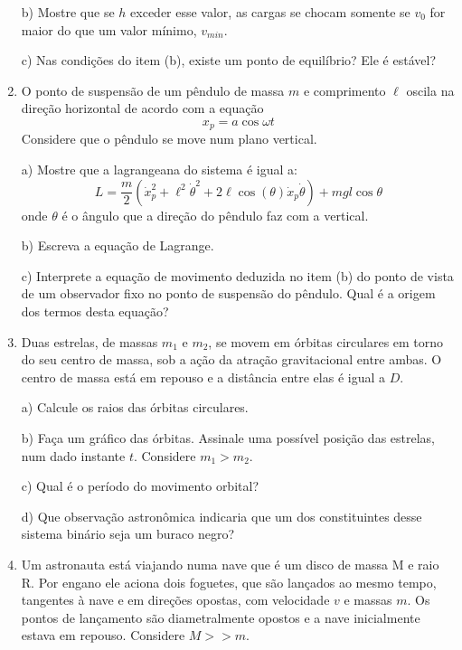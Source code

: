 \begin{enumerate}[start=1,label={\bfseries Q\arabic*.}]
\resposta

b) Mostre que se $h$ exceder esse valor, as cargas se chocam somente se $v_{0}$ for maior do que um valor mínimo, $v_{min}$.

\resposta

c) Nas condições do item (b), existe um ponto de equilíbrio? Ele é estável?

\resposta


\item O ponto de suspensão de um pêndulo de massa $m$ e comprimento $\ell$ oscila na direção horizontal de acordo com a equação
$$
x_{p} = a \operatorname{cos} \omega t
$$
Considere que o pêndulo se move num plano vertical.

a) Mostre que a lagrangeana do sistema é igual a:
$$
L = \frac{m}{2} (\dot{x}_{p}^{2} + \ell^{2} \dot{\theta}^{2} + 2 \ell \operatorname{cos}(\theta) \dot{x}_{p} \dot{\theta} ) + mgl \operatorname{cos} \theta
$$
onde $\theta$ é o ângulo que a direção do pêndulo faz com a vertical.

\resposta

b) Escreva a equação de Lagrange.

\resposta

c) Interprete a equação de movimento deduzida no item (b) do ponto de vista de um observador fixo no ponto de suspensão do pêndulo. Qual é a origem dos termos desta equação?

\resposta


\item Duas estrelas, de massas $m_{1}$ e $m_{2}$, se movem em órbitas circulares em torno do seu centro de massa, sob a ação da atração gravitacional entre ambas. O centro de massa está em repouso e a distância entre elas é igual a $D$.

a) Calcule os raios das órbitas circulares.

\resposta

b) Faça um gráfico das órbitas. Assinale uma possível posição das estrelas, num dado instante $t$. Considere $m_{1} >  m_{2}$.

\resposta

c) Qual é o período do movimento orbital?

\resposta

d) Que observação astronômica indicaria que um dos constituintes desse sistema binário seja um buraco negro?

\resposta


\item Um astronauta está viajando numa nave que é um disco de massa M e raio R. Por engano ele aciona dois foguetes, que são lançados ao mesmo tempo, tangentes à nave e em direções opostas, com velocidade $v$ e massas $m$. Os pontos de lançamento são diametralmente opostos e a nave inicialmente estava em repouso. Considere $M >> m$.


\end{enumerate}
